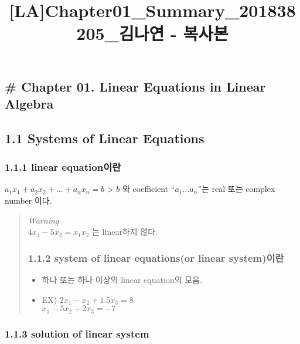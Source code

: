 \documentclass[11pt]{article}
\title{[LA]Chapter01\_Summary\_201838205\_김나연 - 복사본}
\providecommand{\tightlist}{%
      \setlength{\itemsep}{0pt}\setlength{\parskip}{0pt}}
\begin{document}
    
    \maketitle
    
    

    
    \hypertarget{chapter-01.-linear-equations-in-linear-algebra}{%
\subsection{\# Chapter 01. Linear Equations in Linear
Algebra}\label{chapter-01.-linear-equations-in-linear-algebra}}

\hypertarget{systems-of-linear-equations}{%
\subsection{1.1 Systems of Linear
Equations}\label{systems-of-linear-equations}}

\hypertarget{linear-equationuxc774uxb780}{%
\subsubsection{1.1.1 linear
equation이란}\label{linear-equationuxc774uxb780}}

\(a_{1}x_{1} + a_{2}x_{2}+...+a_{n}x_{n}=b\) \textgreater{} \(b\) 와
coefficient ``\(a_{1}...a_{n}\)''는 real 또는 complex number 이다.

\begin{quote}
\emph{Warning}\\
\(4x_{1} - 5x_{2} = x_{1}x_{2}\) 는 linear하지 않다.

\hypertarget{system-of-linear-equationsor-linear-systemuxc774uxb780}{%
\subsubsection{1.1.2 system of linear equations(or linear
system)이란}\label{system-of-linear-equationsor-linear-systemuxc774uxb780}}

\begin{itemize}
\tightlist
\item
  하나 또는 하나 이상의 linear equation의 모음.
\item
  EX) \(2x_{1} - x_{2} + 1.5x_{3} = 8\)\\
  \(x_{1} - 5x_{2} + 2x_{3} = -7\)
\end{itemize}
\end{quote}

\hypertarget{solution-of-linear-system}{%
\subsubsection{1.1.3 solution of linear
system}\label{solution-of-linear-system}}
\end{document}
